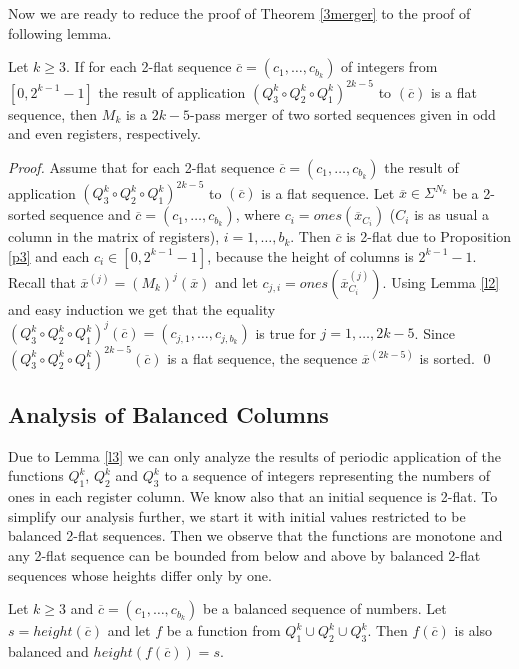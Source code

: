 \documentclass{llncs}
\begin{document}
Now we are ready to reduce the proof of Theorem \ref{3merger} to the
proof of following lemma.
\begin{lemma} \label{l3}
Let $k\ge 3$. If for each 2-flat sequence $\overline{c} =
(c_1,\ldots,c_{b_k})$ of integers from $[0,2^{k-1}-1]$ the result of
application $(Q^k_3\circ Q^k_2\circ Q^k_1)^{2k-5}$ to $(\overline{c})$ is a
flat sequence, then $M_k$ is a $2k-5$-pass merger of two sorted sequences
given in odd and even registers, respectively.
\end{lemma}
\begin{proof}
Assume that for each 2-flat sequence $\overline{c} =
(c_1,\ldots,c_{b_k})$ the result of application $(Q^k_3\circ Q^k_2\circ
Q^k_1)^{2k-5}$ to $(\overline{c})$ is a flat sequence.  Let
$\overline{x}\in \Sigma^{N_k}$ be a 2-sorted sequence and $\overline{c}
= (c_1,\ldots,c_{b_k})$, where $c_i=ones(\overline{x}_{C_i})$ ($C_i$ is
as usual a column in the matrix of registers), $i=1,\ldots,b_k$. Then
$\overline{c}$ is 2-flat due to Proposition \ref{p3} and each 
$c_i\in[0,2^{k-1}-1]$, because the height of columns is $2^{k-1}-1$. Recall 
that $\overline{x}^{(j)}=(M_k)^j(\overline{x})$ and let
$c_{j,i}=ones(\overline{x}^{(j)}_{C_i})$. Using Lemma \ref{l2} and easy
induction we get that the equality $(Q^k_3\circ Q^k_2\circ
Q^k_1)^{j}(\overline{c}) = (c_{j,1},\ldots,c_{j,b_k})$ is true for
$j=1,\ldots,2k-5$. Since $(Q^k_3\circ Q^k_2\circ
Q^k_1)^{2k-5}(\overline{c})$ is a flat sequence, the sequence
$\overline{x}^{(2k-5)}$ is sorted. \qed
\end{proof}

\subsection{Analysis of Balanced Columns}

Due to Lemma \ref{l3} we can only analyze the results of periodic
application of the functions $Q^k_1$, $Q^k_2$ and $Q^k_3$ to a sequence
of integers representing the numbers of ones in each register column. We
know also that an initial sequence is 2-flat. To simplify our analysis
further, we start it with initial values restricted to be balanced
2-flat sequences. Then we observe that the functions are monotone and
any 2-flat sequence can be bounded from below and above by balanced
2-flat sequences whose heights differ only by one.

\begin{lemma} \label{l4}
Let $k\ge 3$ and $\overline{c} = (c_1,\ldots,c_{b_k})$ be a balanced
sequence of numbers. Let $s = height(\overline{c})$ and let $f$ be a
function from $Q^k_1\cup Q^k_2\cup Q^k_3$. Then $f(\overline{c})$ is
also balanced and $height(f(\overline{c}))=s$.
\end{lemma}
\end{document}
